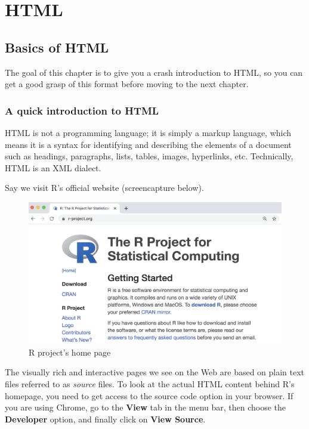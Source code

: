 \documentclass[
]{book}
\begin{document}
\hypertarget{part-html}{%
\part{HTML}\label{part-html}}

\hypertarget{html}{%
\chapter{Basics of HTML}\label{html}}

The goal of this chapter is to give you a crash introduction to HTML,
so you can get a good grasp of this format before moving to the next chapter.

\hypertarget{a-quick-introduction-to-html}{%
\section{A quick introduction to HTML}\label{a-quick-introduction-to-html}}

HTML is not a programming language; it is simply a markup language, which means
it is a syntax for identifying and describing the elements of a document such
as headings, paragraphs, lists, tables, images, hyperlinks, etc. Technically,
HTML is an XML dialect.

Say we visit R's official website (screencapture below).

\begin{figure}

{\centering \includegraphics[width=0.75\linewidth]{images/html/r-webpage2} 

}

\caption{R project's home page}\label{fig:unnamed-chunk-73}
\end{figure}

The visually rich and interactive pages we see on the Web are based on plain
text files referred to as \emph{source} files. To look at the actual HTML content
behind R's homepage, you need to get access to the source code option in your
browser. If you are using Chrome, go to the \textbf{View} tab in the menu bar, then
choose the \textbf{Developer} option, and finally click on \textbf{View Source}.
\end{document}
